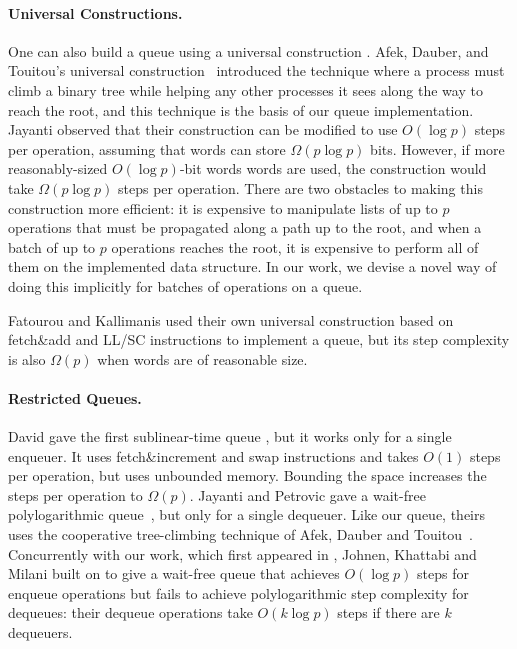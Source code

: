
\paragraph{Universal Constructions.}
One can also build a queue using a universal construction \cite{10.1145/114005.102808}.
Afek, Dauber, and Touitou's universal construction~\cite{DBLP:conf/stoc/AfekDT95}
introduced the technique where a process must climb a binary tree while helping any other processes it sees along the way to reach the root,
and this technique is the basis of our queue implementation.
Jayanti \cite{DBLP:conf/podc/Jayanti98a} observed that
their construction can be modified to use $O(\log p)$ steps per operation, 
assuming that words can store $\Omega(p \log p)$ bits. 
However, if more reasonably-sized $O(\log p)$-bit words words are used, the construction would take $\Omega(p\log p)$ steps per operation.
There are two obstacles to making this construction more efficient:
it is expensive to manipulate lists of up to $p$ operations that must be propagated along a path
up to the root, and
when a batch of up to $p$ operations reaches the root, it is expensive to perform all of them on the
implemented data structure.
In our work, we devise a novel way of doing this implicitly for batches of operations on a queue.

Fatourou and Kallimanis \cite{FK14} used their own universal construction based on fetch\&add and LL/SC instructions
to implement a queue, but its step complexity is also $\Omega(p)$ when words are of reasonable size.

\paragraph{Restricted Queues.}
David gave the first sublinear-time queue
\cite{DBLP:conf/wdag/David04}, but it works only for a single enqueuer.
It uses fetch\&increment and swap  instructions and takes $O(1)$ steps per operation, but
uses unbounded memory.  Bounding the space increases the steps per operation to $\Omega(p)$.
Jayanti and Petrovic gave a wait-free polylogarithmic
queue~\cite{DBLP:conf/fsttcs/JayantiP05}, but only for a single dequeuer. 
Like our queue, theirs uses the cooperative tree-climbing
technique of Afek, Dauber and Touitou~\cite{DBLP:conf/stoc/AfekDT95}.
Concurrently with our work, which first appeared in \cite{Nad22}, Johnen, Khattabi and Milani \cite{JKM23} built on \cite{DBLP:conf/fsttcs/JayantiP05} to give a wait-free queue  
that achieves $O(\log p)$ steps for enqueue operations but fails to achieve polylogarithmic step complexity for dequeues: their dequeue operations take $O(k \log p)$ steps if there are $k$ dequeuers.

